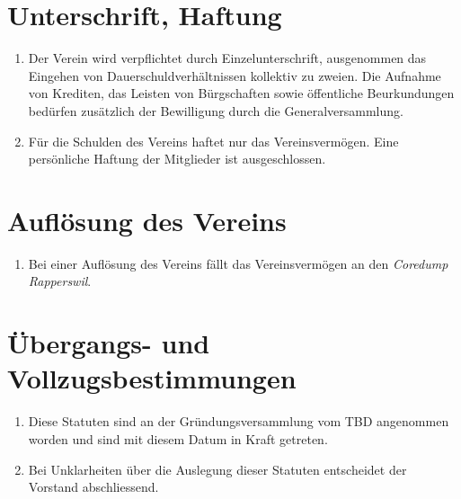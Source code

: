 \documentclass[10pt,a4paper,parskip,fleqn]{scrartcl}
\newcommand{\ol}{\begin{enumerate}[itemsep=-0.2em,topsep=-0.2em]}
\newcommand{\lo}{\end{enumerate}}
\newcommand{\li}{\item}
\newcommand{\parent}{Coredump Rapperswil\xspace}
\newcommand{\iparent}{\textit{\parent}\xspace}
\begin{document}
\section{Unterschrift, Haftung}

\ol
	\li Der Verein wird verpflichtet durch Einzelunterschrift, ausgenommen das
	Eingehen von Dauerschuldverhältnissen kollektiv zu zweien. Die Aufnahme von
	Krediten, das Leisten von Bürgschaften sowie öffentliche Beurkundungen
	bedürfen zusätzlich der Bewilligung durch die Generalversammlung.
	\li Für die Schulden des Vereins haftet nur das Vereinsvermögen. Eine
	persönliche Haftung der Mitglieder ist ausgeschlossen.
\lo


\section{Auflösung des Vereins}

\ol
	\li Bei einer Auflösung des Vereins fällt das Vereinsvermögen an den \iparent.
\lo


\section{Übergangs- und Vollzugsbestimmungen}

\ol
	\li Diese Statuten sind an der Gründungsversammlung vom TBD
	angenommen worden und sind mit diesem Datum in Kraft getreten.
	\li Bei Unklarheiten über die Auslegung dieser Statuten entscheidet der
	Vorstand abschliessend.
\lo
\end{document}
